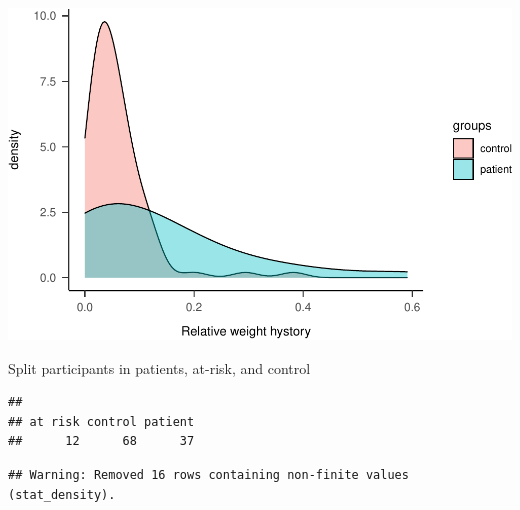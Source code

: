 \documentclass[
]{article}
\newenvironment{Shaded}{\begin{snugshade}}{\end{snugshade}}
\newcommand{\DecValTok}[1]{\textcolor[rgb]{0.00,0.00,0.81}{#1}}
\newcommand{\FunctionTok}[1]{\textcolor[rgb]{0.00,0.00,0.00}{#1}}
\newcommand{\NormalTok}[1]{#1}
\newcommand{\OtherTok}[1]{\textcolor[rgb]{0.56,0.35,0.01}{#1}}
\newcommand{\SpecialCharTok}[1]{\textcolor[rgb]{0.00,0.00,0.00}{#1}}
\newcommand{\StringTok}[1]{\textcolor[rgb]{0.31,0.60,0.02}{#1}}
\begin{document}
\includegraphics{046_weight_history_alpha_files/figure-latex/unnamed-chunk-4-1.pdf}

Split participants in patients, at-risk, and control

\begin{Shaded}
\end{Shaded}

\begin{verbatim}
## 
## at risk control patient 
##      12      68      37
\end{verbatim}

\begin{verbatim}
## Warning: Removed 16 rows containing non-finite values (stat_density).
\end{verbatim}
\end{document}
